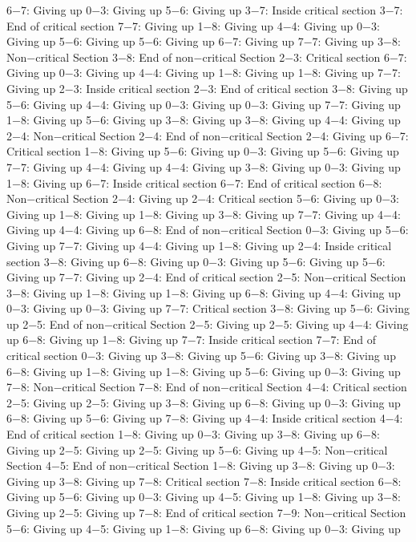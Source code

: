 6−7: Giving up
0−3: Giving up
5−6: Giving up
3−7: Inside critical section
3−7: End of critical section
7−7: Giving up
1−8: Giving up
4−4: Giving up
0−3: Giving up
5−6: Giving up
5−6: Giving up
6−7: Giving up
7−7: Giving up
3−8: Non−critical Section
3−8: End of non−critical Section
2−3: Critical section
6−7: Giving up
0−3: Giving up
4−4: Giving up
1−8: Giving up
1−8: Giving up
7−7: Giving up
2−3: Inside critical section
2−3: End of critical section
3−8: Giving up
5−6: Giving up
4−4: Giving up
0−3: Giving up
0−3: Giving up
7−7: Giving up
1−8: Giving up
5−6: Giving up
3−8: Giving up
3−8: Giving up
4−4: Giving up
2−4: Non−critical Section
2−4: End of non−critical Section
2−4: Giving up
6−7: Critical section
1−8: Giving up
5−6: Giving up
0−3: Giving up
5−6: Giving up
7−7: Giving up
4−4: Giving up
4−4: Giving up
3−8: Giving up
0−3: Giving up
1−8: Giving up
6−7: Inside critical section
6−7: End of critical section
6−8: Non−critical Section
2−4: Giving up
2−4: Critical section
5−6: Giving up
0−3: Giving up
1−8: Giving up
1−8: Giving up
3−8: Giving up
7−7: Giving up
4−4: Giving up
4−4: Giving up
6−8: End of non−critical Section
0−3: Giving up
5−6: Giving up
7−7: Giving up
4−4: Giving up
1−8: Giving up
2−4: Inside critical section
3−8: Giving up
6−8: Giving up
0−3: Giving up
5−6: Giving up
5−6: Giving up
7−7: Giving up
2−4: End of critical section
2−5: Non−critical Section
3−8: Giving up
1−8: Giving up
1−8: Giving up
6−8: Giving up
4−4: Giving up
0−3: Giving up
0−3: Giving up
7−7: Critical section
3−8: Giving up
5−6: Giving up
2−5: End of non−critical Section
2−5: Giving up
2−5: Giving up
4−4: Giving up
6−8: Giving up
1−8: Giving up
7−7: Inside critical section
7−7: End of critical section
0−3: Giving up
3−8: Giving up
5−6: Giving up
3−8: Giving up
6−8: Giving up
1−8: Giving up
1−8: Giving up
5−6: Giving up
0−3: Giving up
7−8: Non−critical Section
7−8: End of non−critical Section
4−4: Critical section
2−5: Giving up
2−5: Giving up
3−8: Giving up
6−8: Giving up
0−3: Giving up
6−8: Giving up
5−6: Giving up
7−8: Giving up
4−4: Inside critical section
4−4: End of critical section
1−8: Giving up
0−3: Giving up
3−8: Giving up
6−8: Giving up
2−5: Giving up
2−5: Giving up
5−6: Giving up
4−5: Non−critical Section
4−5: End of non−critical Section
1−8: Giving up
3−8: Giving up
0−3: Giving up
3−8: Giving up
7−8: Critical section
7−8: Inside critical section
6−8: Giving up
5−6: Giving up
0−3: Giving up
4−5: Giving up
1−8: Giving up
3−8: Giving up
2−5: Giving up
7−8: End of critical section
7−9: Non−critical Section
5−6: Giving up
4−5: Giving up
1−8: Giving up
6−8: Giving up
0−3: Giving up
